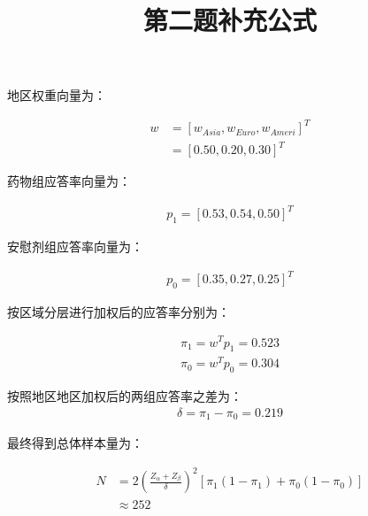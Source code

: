 \documentclass{article}
\title{第二题补充公式}
\author{}
\date{}
\begin{document}
	\maketitle
	\tableofcontents



地区权重向量为：

\begin{align*}
w &= [w_{Asia},w_{Euro},w_{Ameri}]^T  \\
  &= [0.50,0.20,0.30]^T
\end{align*}


药物组应答率向量为：

\begin{align*}
p_1 = [0.53,0.54,0.50]^T
\end{align*}

安慰剂组应答率向量为：

\begin{align*}
p_0 = [0.35,0.27,0.25]^T
\end{align*}


按区域分层进行加权后的应答率分别为：

\begin{align*}
\pi_1 = w^T p_1 = 0.523\\
\pi_0 = w^T p_0 = 0.304
\end{align*}

按照地区地区加权后的两组应答率之差为：
\begin{align*}
\delta = \pi_1 - \pi_0 = 0.219
\end{align*}

最终得到总体样本量为：


\begin{align*}
N &= 2\left( 
    \frac{Z_\alpha + Z_\beta}{\delta}
\right)^2\left[\pi_1(1-\pi_1) + \pi_0(1-\pi_0) \right] \\
&\approx 252 
\end{align*}
\end{document}
